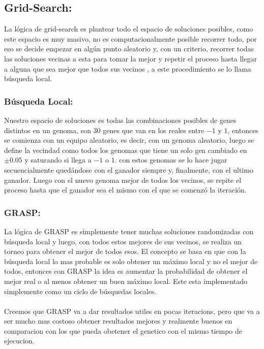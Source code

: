 \subsection{Grid-Search:}

La lógica de grid-search es plantear todo el espacio de soluciones posibles, como este espacio
es muy masivo, no es computacionalmente posible recorrer todo, por eso se decide empezar
en algún punto aleatorio y, con un criterio, recorrer todas las soluciones vecinas a esta
para tomar la mejor y repetir el proceso hasta llegar a alguna que sea mejor que todos sus vecinos
, a este procedimiento se lo llama búsqueda local.


\subsubsection{Búsqueda Local:}


Nuestro espacio de soluciones es todas las combinaciones posibles de genes distintos en un genoma,
son 30 genes que van en los reales entre $-1$ y $1$, entonces se comienza con un equipo aleatorio,
es decir, con un genoma aleatorio, luego se define la vecindad como todos los genomas que tiene
un solo gen cambiado en $\pm 0.05$ y saturando si llega a $-1$ o $1$. con estos genomas se lo hace
jugar secuencialmente quedándose con el ganador siempre y, finalmente, con el ultimo ganador.
Luego con el nuevo genoma mejor de todos los vecinos, se repite el proceso hasta que el ganador
sea el mismo con el que se comenzó la iteración.


\subsubsection{GRASP:}


La lógica de GRASP es simplemente tener muchas soluciones randomizadas con búsqueda local y luego, con todos
estos mejores de sus vecinos, se realiza un torneo para obtener el mejor de todos esos.
El concepto se basa en que con la búsqueda local lo mas probable es solo obtener un máximo local y no
el mejor de todos, entonces con GRASP la idea es aumentar la probabilidad de obtener el mejor real o
al menos obtener un buen máximo local.
Este esta implementado simplemente como un ciclo de búsquedas locales.
\\
\\

Creemos que GRASP va a dar resultados utiles en pocas iteracions, pero que va 
a ser mucho mas costoso obtener resultados mejores y realmente buenos en comparacion
con los que pueda obetener el genetico con el mismo tiempo de ejecucion.
